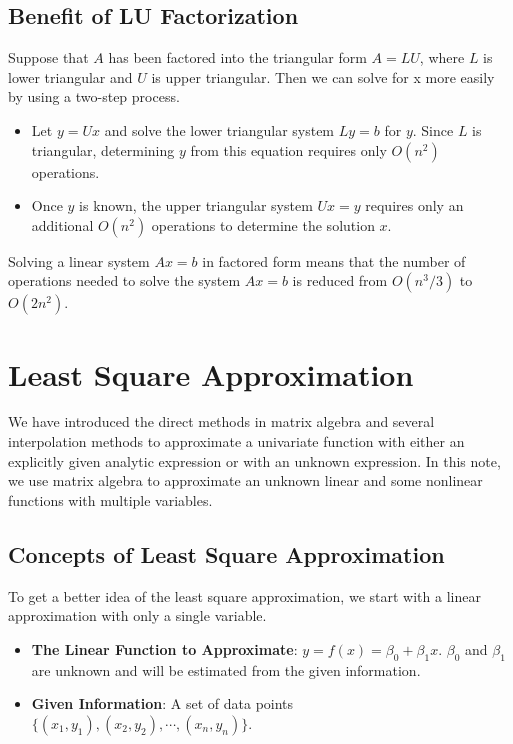 \documentclass[
]{book}
\begin{document}
\hypertarget{benefit-of-lu-factorization}{%
\section{Benefit of LU Factorization}\label{benefit-of-lu-factorization}}

Suppose that \(A\) has been factored into the triangular form \(A = LU\), where \(L\) is lower triangular and \(U\) is upper triangular. Then we can solve for x more easily by using a two-step process.

\begin{itemize}
\item
  Let \(y = Ux\) and solve the lower triangular system \(Ly = b\) for \(y\). Since \(L\) is triangular, determining \(y\) from this equation requires only \(O(n^2)\) operations.
\item
  Once \(y\) is known, the upper triangular system \(Ux = y\) requires only an additional \(O(n^2)\) operations to determine the solution \(x\).
\end{itemize}

Solving a linear system \(Ax = b\) in factored form means that the number of operations needed to solve the system \(Ax = b\) is reduced from \(O(n^3/3)\) to \(O(2n^2)\).

\hypertarget{least-square-approximation}{%
\chapter{Least Square Approximation}\label{least-square-approximation}}

We have introduced the direct methods in matrix algebra and several interpolation methods to approximate a univariate function with either an explicitly given analytic expression or with an unknown expression. In this note, we use matrix algebra to approximate an unknown linear and some nonlinear functions with multiple variables.

\hfill\break

\hypertarget{concepts-of-least-square-approximation}{%
\section{Concepts of Least Square Approximation}\label{concepts-of-least-square-approximation}}

To get a better idea of the least square approximation, we start with a linear approximation with only a single variable.

\begin{itemize}
\item
  \textbf{The Linear Function to Approximate}: \(y = f(x) =\beta_0 + \beta_1 x\). \(\beta_0\) and \(\beta_1\) are unknown and will be estimated from the given information.
\item
  \textbf{Given Information}: A set of data points \(\{(x_1, y_1), (x_2, y_2), \cdots, (x_n, y_n)\}\).
\end{itemize}
\end{document}
